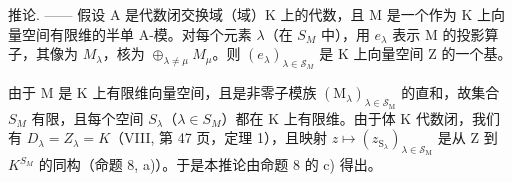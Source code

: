 推论. —— 假设 A 是代数闭交换域（域）K 上的代数，且 M 是一个作为 K 上向量空间有限维的半单 A-模。对每个元素 \(\lambda\)（在 \(S_{M}\) 中），用 \(e_{\lambda}\) 表示 M 的投影算子，其像为 \(M_{\lambda}\)，核为 \(\oplus_{\lambda\neq\mu}M_{\mu}\)。则 \((e_{\lambda})_{\lambda\in\mathcal{S}_{M}}\) 是 K 上向量空间 Z 的一个基。

由于 M 是 K 上有限维向量空间，且是非零子模族 \((\mathrm{M}_{\lambda})_{\lambda\in\mathcal{S}_{\mathrm{M}}}\) 的直和，故集合 \(S_{M}\) 有限，且每个空间 \(S_{\lambda}\)（\(\lambda\in S_{M}\)）都在 K 上有限维。由于体 K 代数闭，我们有 \(D_{\lambda}=Z_{\lambda}=K\)（VIII, 第 47 页，定理 1），且映射 \(z\mapsto(z_{\mathrm{S}_{\lambda}})_{\lambda\in\mathcal{S}_{\mathrm{M}}}\) 是从 Z 到 \(K^{S_{M}}\) 的同构（命题 8, a)）。于是本推论由命题 8 的 c) 得出。

